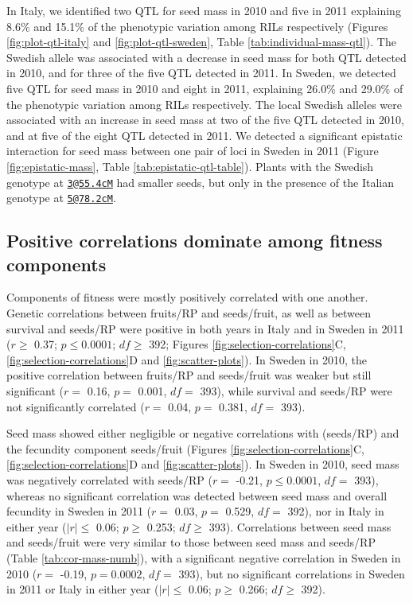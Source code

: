 \documentclass[]{article}
\begin{document}
In Italy, we identified two QTL for seed mass in 2010 and five in 2011 explaining 8.6\% and 15.1\% of the phenotypic variation among RILs respectively (Figures \ref{fig:plot-qtl-italy} and \ref{fig:plot-qtl-sweden}, Table \ref{tab:individual-mass-qtl}). The Swedish allele was associated with a decrease in seed mass for both QTL detected in 2010, and for three of the five QTL detected in 2011. In Sweden, we detected five QTL for seed mass in 2010 and eight in 2011, explaining 26.0\% and 29.0\% of the phenotypic variation among RILs respectively. The local Swedish alleles were associated with an increase in seed mass at two of the five QTL detected in 2010, and at five of the eight QTL detected in 2011. We detected a significant epistatic interaction for seed mass between one pair of loci in Sweden in 2011 (Figure \ref{fig:epistatic-mass}, Table \ref{tab:epistatic-qtl-table}). Plants with the Swedish genotype at \href{mailto:3@55.4cM}{\nolinkurl{3@55.4cM}} had smaller seeds, but only in the presence of the Italian genotype at \href{mailto:5@78.2cM}{\nolinkurl{5@78.2cM}}.

\hypertarget{positive-correlations-dominate-among-fitness-components}{%
\subsection{Positive correlations dominate among fitness components}\label{positive-correlations-dominate-among-fitness-components}}

Components of fitness were mostly positively correlated with one another. Genetic correlations between fruits/RP and seeds/fruit, as well as between survival and seeds/RP were positive in both years in Italy and in Sweden in 2011
(\(r \geq\)
0.37;
\(p \leq 0.0001\);
\(df \geq\)
392;
Figures \ref{fig:selection-correlations}C, \ref{fig:selection-correlations}D and \ref{fig:scatter-plots}).
In Sweden in 2010, the positive correlation between fruits/RP and seeds/fruit was weaker but still significant
(\(r=\) 0.16,
\(p=\) 0.001,
\(df=\) 393),
while survival and seeds/RP were not significantly correlated
(\(r=\) 0.04,
\(p=\) 0.381,
\(df=\) 393).

Seed mass showed either negligible or negative correlations with (seeds/RP) and the fecundity component seeds/fruit (Figures \ref{fig:selection-correlations}C, \ref{fig:selection-correlations}D and \ref{fig:scatter-plots}).
In Sweden in 2010, seed mass was negatively correlated with seeds/RP
(\(r=\) -0.21,
\(p \leq 0.0001\),
\(df=\) 393),
whereas no significant correlation was detected between seed mass and overall fecundity in Sweden in 2011
(\(r=\) 0.03,
\(p=\) 0.529,
\(df=\) 392),
nor in Italy in either year
(\(|r| \leq\) 0.06;
\(p \geq\) 0.253;
\(df \geq\)
393).
Correlations between seed mass and seeds/fruit were very similar to those between seed mass and seeds/RP (Table \ref{tab:cor-mass-numb}), with a significant negative correlation in Sweden in 2010
(\(r=\) -0.19,
\(p = 0.0002\),
\(df=\) 393),
but no significant correlations in Sweden in 2011 or Italy in either year
(\(|r| \leq\) 0.06;
\(p \geq\) 0.266;
\(df \geq\)
392).
\end{document}
